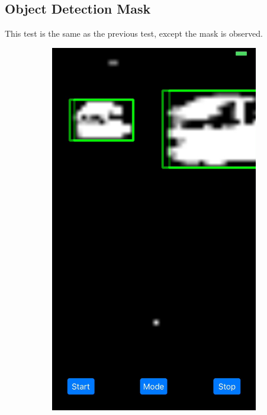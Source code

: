 \documentclass[11pt,letterpaper]{article}
\begin{document}
	\newpage
	\subsection*{Object Detection Mask}
	This test is the same as the previous test, except the mask is observed. \\
	
	\begin{figure}[h!]
		\centering
		\begin{subfigure}{.4\textwidth}
			\centering
			\includegraphics[width=1\linewidth]{mode3a}

\end{subfigure}
\end{figure}
\end{document}
